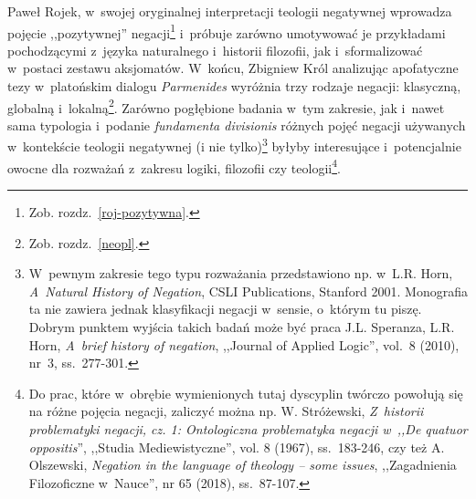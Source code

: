 \begin{enumerate}[label = \arabic*), itemindent=6mm, labelwidth=4mm, labelsep=2mm, itemsep=1em, leftmargin=0mm]
Paweł Rojek, w~swojej oryginalnej interpretacji teologii negatywnej wprowadza pojęcie ,,pozytywnej'' negacji\footnote{Zob. rozdz.~\ref{roj-pozytywna}.} i~próbuje zarówno umotywować je przykładami pochodzącymi z~języka naturalnego i~historii filozofii, jak i~sformalizować w~postaci zestawu aksjomatów. W~końcu, Zbigniew Król analizując apofatyczne tezy w~platońskim dialogu \textit{Parmenides} wyróżnia trzy rodzaje negacji: klasyczną, globalną i~lokalną\footnote{Zob. rozdz.~\ref{neopl}.}. Zarówno pogłębione badania w~tym zakresie, jak i~nawet sama typologia i~podanie \textit{fundamenta divisionis} różnych pojęć negacji używanych w~kontekście teologii negatywnej (i nie tylko)\footnote{W~pewnym zakresie tego typu rozważania przedstawiono np. w~L.R. Horn, \textit{A~Natural History of Negation}, CSLI Publications, Stanford 2001. Monografia ta nie zawiera jednak klasyfikacji negacji w~sensie, o~którym tu piszę. Dobrym punktem wyjścia takich badań może być praca J.L. Speranza, L.R. Horn, \textit{A~brief history of negation}, ,,Journal of Applied Logic'', vol.~8 (2010), nr~3, ss.~277-301.} byłyby interesujące i~potencjalnie owocne dla rozważań z~zakresu logiki, filozofii czy teologii\footnote{Do prac, które w~obrębie wymienionych tutaj dyscyplin twórczo powołują się na różne pojęcia negacji, zaliczyć można np. W. Stróżewski, \textit{Z~historii problematyki negacji, cz. 1: Ontologiczna problematyka negacji w~,,De quatuor oppositis}'', ,,Studia Mediewistyczne'', vol. 8 (1967), ss.~183-246, czy też A. Olszewski, \textit{Negation in the language of theology -- some issues}, ,,Zagadnienia Filozoficzne w~Nauce'', nr 65 (2018), ss.~87-107.}.


\end{enumerate}
